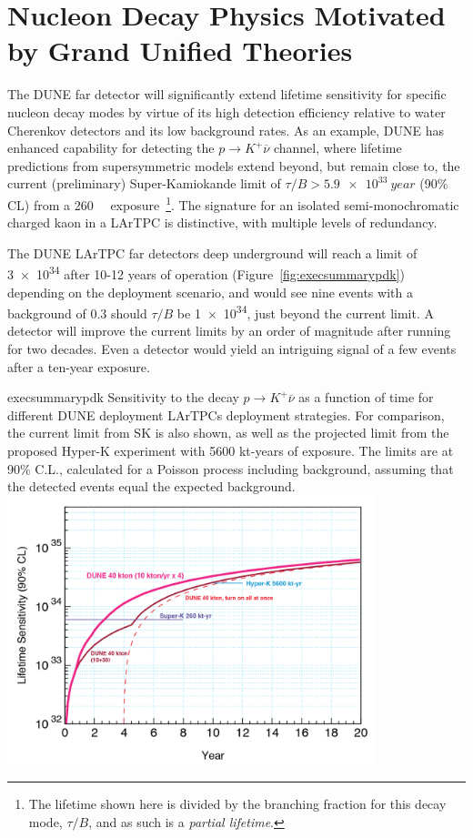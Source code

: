 \section{Nucleon Decay Physics Motivated by Grand Unified Theories}


The DUNE far detector will significantly extend lifetime sensitivity
for specific nucleon decay modes by virtue of its high detection
efficiency relative to water Cherenkov detectors and its low
background rates.  As an example, DUNE has enhanced capability for
detecting the $p\to K^+\overline{\nu}$ channel, where lifetime
predictions from supersymmetric models extend beyond, but remain close
to, the current (preliminary) Super-Kamiokande limit of $\tau/B >
\SI{5.9e33}{year}$ (90\% CL) from a \SI[number-unit-product = -,
inter-unit-product=\ensuremath{{}\cdot{}}]{260}{\kt\year}
exposure~\cite{kearns_isoups}\footnote{The lifetime shown here is
  divided by the branching fraction for this decay mode, $\tau/B$, and
  as such is a \emph{partial lifetime}.}.  The signature for an
isolated semi-monochromatic charged kaon in a LArTPC is distinctive,
with multiple levels of redundancy. 

The DUNE LArTPC far detectors deep underground will reach a limit of
\SI{3e34}{\year} after 10-12 years of operation
(Figure~\ref{fig:execsummarypdk}) depending on the deployment
scenario, and would see nine events with a background of 0.3 should
$\tau/B$ be \SI{1e34}{\year}, just beyond the current limit. A
 detector will improve the current limits by an order of
magnitude after running for two decades. Even a  detector
would yield an intriguing signal of a few events after a ten-year
exposure.


\begin{cdrfigure}{execsummarypdk} {Sensitivity to the
    decay $p\to K^+ \overline{\nu}$ as a function of time for different DUNE 
deployment  LArTPCs deployment strategies. 
  For comparison, the current limit from SK is also shown, as well as the projected limit from the proposed Hyper-K experiment with 5600 kt-years of exposure.
  The limits are at 90\% C.L., calculated for
  a Poisson process including background, assuming that the detected events
  equal the expected background.}
\includegraphics[width=0.8\textwidth]{volume-physics/figures/lar4x10.png}
\end{cdrfigure}

